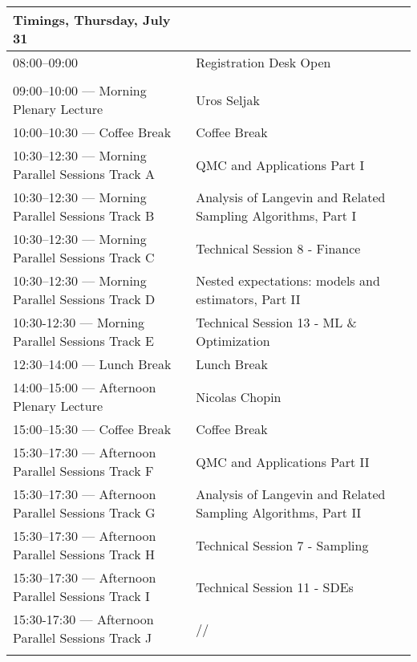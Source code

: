 \begin{sideways}
\begin{tabular}{l|l}
\hline
\large\textbf{Timings, Thursday, 
 July 31} & \large\textbf{} \\
\hline
\cellcolor{\EmptyColor}08:00–09:00 & \cellcolor{\EmptyColor}Registration Desk Open \\
\cellcolor{\SessionTitleColor} & \cellcolor{\SessionTitleColor} \\
\cellcolor{\PlenaryColor}09:00–10:00 — Morning Plenary Lecture & \cellcolor{\PlenaryColor}Uros Seljak \\
\cellcolor{\EmptyColor}10:00–10:30 — Coffee Break & \cellcolor{\EmptyColor}Coffee Break \\
\cellcolor{\SessionTitleColor}10:30–12:30 — Morning Parallel Sessions Track A & \cellcolor{\SessionTitleColor}QMC and Applications Part I \\
\cellcolor{\SessionTitleColor}10:30–12:30 — Morning Parallel Sessions Track B & \cellcolor{\SessionTitleColor}Analysis of Langevin and Related Sampling Algorithms, Part I \\
\cellcolor{\SessionLightColor}10:30–12:30 — Morning Parallel Sessions Track C & \cellcolor{\SessionLightColor}Technical Session 8 - Finance \\
\cellcolor{\SessionTitleColor}10:30–12:30 — Morning Parallel Sessions Track D & \cellcolor{\SessionTitleColor}Nested expectations: models and estimators, Part II \\
\cellcolor{\SessionLightColor}10:30-12:30 — Morning Parallel Sessions Track E & \cellcolor{\SessionLightColor}Technical Session 13 - ML \& Optimization \\
\cellcolor{\EmptyColor}12:30–14:00 — Lunch Break & \cellcolor{\EmptyColor}Lunch Break \\
\cellcolor{\PlenaryColor}14:00–15:00 — Afternoon Plenary Lecture & \cellcolor{\PlenaryColor}Nicolas Chopin \\
\cellcolor{\EmptyColor}15:00–15:30 — Coffee Break & \cellcolor{\EmptyColor}Coffee Break \\
\cellcolor{\SessionTitleColor}15:30–17:30 — Afternoon Parallel Sessions Track F & \cellcolor{\SessionTitleColor}QMC and Applications Part II \\
\cellcolor{\SessionTitleColor}15:30–17:30 — Afternoon Parallel Sessions Track G & \cellcolor{\SessionTitleColor}Analysis of Langevin and Related Sampling Algorithms, Part II \\
\cellcolor{\SessionLightColor}15:30–17:30 — Afternoon Parallel Sessions Track H & \cellcolor{\SessionLightColor}Technical Session 7 - Sampling \\
\cellcolor{\SessionLightColor}15:30–17:30 — Afternoon Parallel Sessions Track I & \cellcolor{\SessionLightColor}Technical Session 11 - SDEs \\
\cellcolor{\SessionTitleColor}15:30-17:30 — Afternoon Parallel Sessions Track J & \cellcolor{\SessionTitleColor}// \\
\cellcolor{\SessionTitleColor} & \cellcolor{\SessionTitleColor} \\
\hline
\end{tabular}
\end{sideways}

